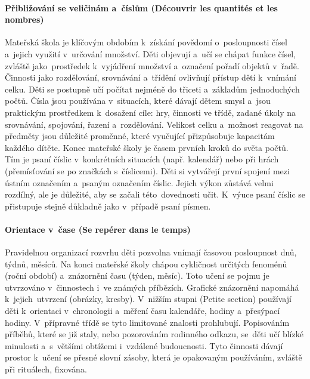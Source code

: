 			\paragraph{Přibližování se veličinám a~číslům (Découvrir les quantités et les nombres)}
				Mateřská škola je klíčovým obdobím k získání povědomí o~posloupnosti čísel a~jejich využití v určování množství. Děti objevují a~učí se chápat funkce čísel, zvláště jako prostředek k~vyjádření množství a~označení pořadí objektů v řadě.
				Činnosti jako rozdělování, srovnávání a~třídění ovlivňují přístup dětí k vnímání celku. Děti se postupně učí počítat nejméně do třiceti a~základům jednoduchých počtů.
				Čísla jsou používána v situacích, které dávají dětem smysl a~jsou praktickým prostředkem k dosažení cíle: hry, činnosti ve třídě, zadané úkoly na srovnávání, spojování, řazení a rozdělování. Velikost celku a~možnost reagovat na předměty jsou důležité proměnné, které vyučující přizpůsobuje kapacitám každého dítěte. 
				Konec mateřské školy je časem prvních kroků do světa počtů. 
				Tím je psaní číslic v konkrétních situacích (např. kalendář) nebo při hrách (přemísťování se po značkách s číslicemi). Děti si vytvářejí první spojení mezi ústním označením a~psaným označením číslic. Jejich výkon zůstává velmi rozdílný, ale je důležité, aby se začali této dovednosti učit. K výuce psaní číslic se přistupuje stejně důkladně jako v případě psaní písmen.
			\paragraph{Orientace v čase (Se repérer dans le temps)}
				Pravidelnou organizací rozvrhu děti pozvolna vnímají časovou posloupnost dnů, týdnů, měsíců. Na konci mateřské školy chápou cykličnost určitých fenoménů (roční období) a znázornění času (týden, měsíc). Toto učení se pojmu je utvrzováno v činnostech i ve známých příbězích. Grafické znázornění napomáhá k~jejich utvrzení (obrázky, kresby).
				V nižším stupni (Petite section) používají děti k orientaci v chronologii a~měření času kalendáře, hodiny a~přesýpací hodiny. V přípravné třídě se tyto limitované znalosti prohlubují. Popisováním příběhů, které se již staly, nebo pozorováním rodinného odkazu, se děti učí blízké minulosti a~s většími obtížemi i~vzdálené budoucnosti.
				Tyto činnosti dávají prostor k učení se přesné slovní zásoby, která je opakovaným používáním, zvláště při rituálech, fixována.
